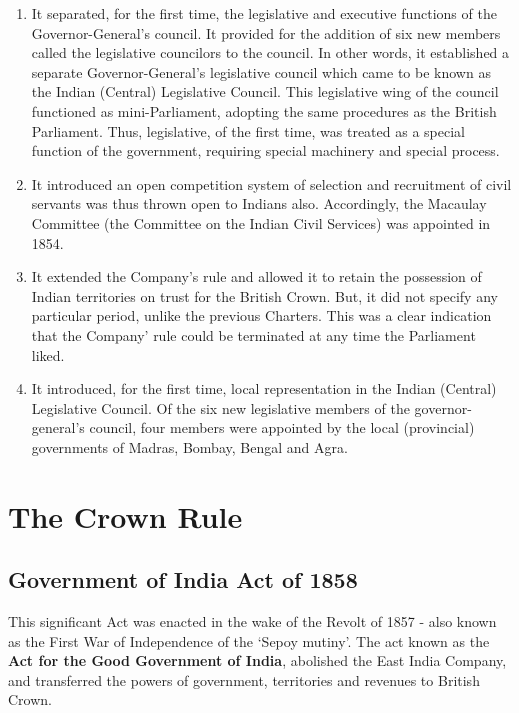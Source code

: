 \begin{multicol}{2}
\begin{enumerate}
  \item It separated, for the first time, the legislative and executive functions of the Governor-General's council. It provided for the addition of six new members called the legislative councilors to the council. In other words, it established a separate Governor-General's legislative council which came to be known as the Indian (Central) Legislative Council. This legislative wing of the council functioned as mini-Parliament, adopting the same procedures as the British Parliament. Thus, legislative, of the first time, was treated as a special function of the government, requiring special machinery and special process.
  \item It introduced an open competition system of selection and recruitment of civil servants was thus thrown open to Indians also. Accordingly, the Macaulay Committee (the Committee on the Indian Civil Services) was appointed in 1854.
  \item It extended the Company's rule and allowed it to retain the possession of Indian territories on trust for the British Crown. But, it did not specify any particular period, unlike the previous Charters. This was a clear indication that the Company' rule could be terminated at any time the Parliament liked.
  \item It introduced, for the first time, local representation in the Indian (Central) Legislative Council. Of the six new legislative members of the governor-general's council, four members were appointed by the local (provincial) governments of Madras, Bombay, Bengal and Agra.
\end{enumerate}

\section{The Crown Rule}

\subsection{Government of India Act of 1858}

This significant Act was enacted in the wake of the Revolt of 1857 - also known as the First War of Independence of the `Sepoy mutiny'. The act known as the \textbf{Act for the Good Government of India}, abolished the East India Company, and transferred the powers of government, territories and revenues to British Crown.


\end{multicol}
